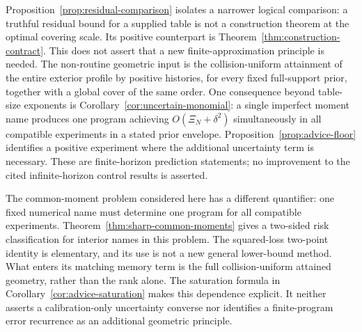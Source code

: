 Proposition~\ref{prop:residual-comparison} isolates a narrower logical
comparison: a truthful residual bound for a supplied table is not a
construction theorem at the optimal covering scale. Its positive
counterpart is Theorem~\ref{thm:construction-contract}. This does not
assert that a new finite-approximation principle is needed. The
non-routine geometric input is the collision-uniform attainment of the
entire exterior profile by positive histories, for every fixed
full-support prior, together with a global cover of the same order.
One consequence beyond table-size exponents is
Corollary~\ref{cor:uncertain-monomial}: a single imperfect moment name
produces one program achieving $O(\Xi_N+\delta^2)$ simultaneously in
all compatible experiments in a stated prior envelope.
Proposition~\ref{prop:advice-floor} identifies a positive experiment
where the additional uncertainty term is necessary. These are
finite-horizon prediction statements; no improvement to the cited
infinite-horizon control results is asserted.


The common-moment problem considered here has a different quantifier:
one fixed numerical name must determine one program for all compatible
experiments. Theorem~\ref{thm:sharp-common-moments} gives a two-sided
risk classification for interior names in this problem. The squared-loss
two-point identity is elementary, and its use is not a new general
lower-bound method. What enters its matching memory term is the full
collision-uniform attained geometry, rather than the rank alone.
The saturation formula in Corollary~\ref{cor:advice-saturation} makes
this dependence explicit. It neither asserts a calibration-only
uncertainty converse nor identifies a finite-program error recurrence
as an additional geometric principle.
